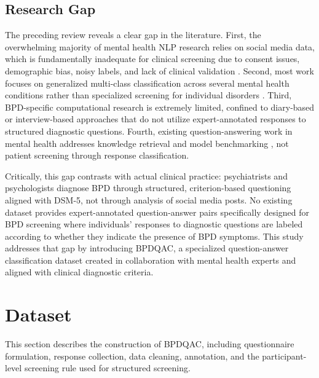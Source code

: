 \documentclass{article}
\begin{document}
\subsection{Research Gap}

The preceding review reveals a clear gap in the literature. First, the overwhelming majority of mental health NLP research relies on social media data, which is fundamentally inadequate for clinical screening due to consent issues, demographic bias, noisy labels, and lack of clinical validation \cite{zhang2022natural}. Second, most work focuses on generalized multi-class classification across several mental health conditions rather than specialized screening for individual disorders \cite{montejo2024survey}. Third, BPD-specific computational research is extremely limited, confined to diary-based \cite{khazbak2021mindtime} or interview-based \cite{wang2020learning} approaches that do not utilize expert-annotated responses to structured diagnostic questions. Fourth, existing question-answering work in mental health addresses knowledge retrieval and model benchmarking \cite{guo2021mental, racha2025mhqa}, not patient screening through response classification.

Critically, this gap contrasts with actual clinical practice: psychiatrists and psychologists diagnose BPD through structured, criterion-based questioning aligned with DSM-5, not through analysis of social media posts. No existing dataset provides expert-annotated question-answer pairs specifically designed for BPD screening where individuals' responses to diagnostic questions are labeled according to whether they indicate the presence of BPD symptoms. This study addresses that gap by introducing BPDQAC, a specialized question-answer classification dataset created in collaboration with mental health experts and aligned with clinical diagnostic criteria.



























\section{Dataset}\label{sec2}
This section describes the construction of BPDQAC, including questionnaire formulation, response collection, data cleaning, annotation, and the participant-level screening rule used for structured screening.
\end{document}
